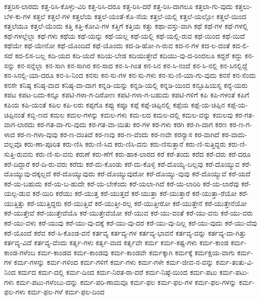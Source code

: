 {ಕತ್ತರಿಸ-ಲಾರದು
ಕತ್ತ-ರಿಸಿ-ಕೊಳ್ಳು-ವಿರಿ
ಕತ್ತ-ರಿಸಿ-ದರೂ
ಕತ್ತ-ರಿಸಿ-ದರೆ
ಕತ್ತ-ರಿಸಿ-ದಾಗಲೂ
ಕತ್ತಲಾ-ಗು-ವುದು
ಕತ್ತಲು-ಬೆಳ-ಕು-ಗಳ
ಕತ್ತಲೆ
ಕತ್ತಲೆ-ಗಳ
ಕತ್ತಲೆಯ
ಕತ್ತಲೆ-ಯಂತೆ-ಕೊ-ನೆಯ
ಕತ್ತಲೆ-ಯಲ್ಲಿ
ಕತ್ತಲೆ-ಯಲ್ಲೋ
ಕತ್ತಲೆ-ಯಿಂದ
ಕತ್ತಲೆಯೂ
ಕತ್ತಲೆ-ಯೆಂದು
ಕತ್ತಿ
ಕತ್ತಿ-ಕೋವಿ-ಗಳ
ಕತ್ತಿಗೆ
ಕತ್ತಿಯ
ಕತ್ತು
ಕಥಾ-ವಸ್ತು-ವಾಗಿ
ಕಥೆ
ಕಥೆ-ಗಳ
ಕಥೆ-ಗಳಲ್ಲಿ
ಕಥೆ-ಗಳಲ್ಲೆಲ್ಲಾ
ಕಥೆ-ಗಳು
ಕಥೆಯ
ಕಥೆ-ಯನ್ನು
ಕಥೆ-ಯಲ್ಲ
ಕಥೆ-ಯಲ್ಲಿ
ಕಥೆ-ಯಲ್ಲಿ-ರುವ
ಕಥೆ-ಯಿಂದ
ಕಥೆ-ಯಿದೆ
ಕಥೆಯೇ
ಕಥೆ-ಯೇನೋ
ಕಥೆ-ಯೊಂದಿದೆ
ಕಥೆ-ಯೊಂದು
ಕದ-ಡಿ-ಹೋ-ಗಿ-ರುವ
ಕದ-ನ-ಗಳ
ಕದ-ಲ-ದಂತೆ
ಕದ-ಲಿ-ಸದೆ
ಕದ-ಲಿಸ-ಬಲ್ಲ
ಕದಿ-ಯದ
ಕದಿ-ಯದೆ
ಕದಿಯ-ಬೇಡ
ಕದಿಯುತ್ತೇವೆ
ಕದಿಯು-ವು-ದ-ರಿಂದಲೂ
ಕದ್ದರೆ
ಕದ್ದು
ಕನ-ಸನ್ನು
ಕನ-ಸನ್ನೆಲ್ಲಾ
ಕನ-ಸಾಗಿ
ಕನ-ಸಾಗಿರ
ಕನ-ಸಾದ
ಕನ-ಸಿ-ಗಿಂತ
ಕನ-ಸಿನ
ಕನ-ಸಿ-ನಂದೆ
ಕನ-ಸಿ-ನಲ್ಲಿ
ಕನ-ಸಿನಲ್ಲಿದ್ದೆ
ಕನ-ಸಿನಲ್ಲಿ-ಯಾ-ದರೂ
ಕನ-ಸಿ-ನಿಂದ
ಕನಸು
ಕನ-ಸು-ಗಳ
ಕನ-ಸು-ಗಳು
ಕನ-ಸು-ಣಿ-ಯಾ-ಗು-ವುದು
ಕನಸೆ
ಕನ-ಸೆಂದು
ಕನಸೇ
ಕನಿಷ್ಠ
ಕನಿಷ್ಠ-ವಾದ
ಕನಿಷ್ಠ-ವಾ-ದಾಗ
ಕನ್ನಡಿ-ಯನ್ನು
ಕನ್ನಡಿ-ಯಲ್ಲಿ
ಕನ್ನಡಿ-ಯಿಂದ
ಕನ್ಫೂಷಿಯಸ್ನ
ಕನ್ಯೆ-ಯರು
ಕಪಟ
ಕಪಟ-ಬದು-ಕನ್ನೂ
ಕಪಟಿ-ಗಳಾ-ಗ-ದಿರೋಣ
ಕಪಟಿ-ಗಳಾ-ಗ-ಬಹುದು
ಕಪಟಿ-ಗಳಿಗೆ
ಕಪಿ
ಕಪಿ-ಗಳಂತೆ
ಕಪಿಗೆ
ಕಪಿಯ
ಕಪಿ-ಯಂತೆ
ಕಪಿಲ
ಕಪಿ-ಲರು
ಕಪ್ಪಗೊ
ಕಪ್ಪು
ಕಪ್ಪೂ
ಕಪ್ಪೆ
ಕಪ್ಪೆ-ಚಿಪ್ಪಿನಲ್ಲಿ
ಕಪ್ಪೆಯ
ಕಪ್ಪೆ-ಯ-ಚಿಪ್ಪಿನ
ಕಪ್ಪೆ-ಯ-ಚಿಪ್ಪಿನಂತೆ
ಕಬ್ಬಿ-ಣದ
ಕಮಲ
ಕಮಲ-ಗಳನ್ನು
ಕಮಲ-ಗಳು
ಕಮ-ಲದ
ಕಮಲ-ದಲ್ಲಿ
ಕಮಲ-ವನ್ನು
ಕಮಲವು
ಕರ-ಗತ-ವಾಗ-ಲಾರದು
ಕರ-ಗತ-ವಾ-ಗು-ವುದು
ಕರ-ಗತ-ವಾ-ಯಿತು
ಕರ-ಗಳ
ಕರ-ಗಳು
ಕರಗಿ
ಕರ-ಗಿ-ದಾಗ
ಕರಣ
ಕರ-ಣ-ಗ-ಳಾದ
ಕರ-ಣ-ಗಳಾ-ವುವು
ಕರ-ಣ-ದಂತಿದೆ
ಕರ-ಣವು
ಕರ-ಣ-ವೆಂದು
ಕರ-ಣವೇ
ಕರನ್ಯಾಸ
ಕರ-ವಾಗಿದೆ
ಕರ-ವಾದು-ವಲ್ಲವೊ
ಕರು-ಣಾ-ಪೂರಿತ
ಕರು-ಣಿಸಿ
ಕರು-ಣಿ-ಸಿದ
ಕರು-ಣಿಸಿ-ದನು
ಕರು-ಣಿಸುತ್ತಾನೆ
ಕರು-ಣಿ-ಸುತ್ತಿದ್ದರು
ಕರು-ಣಿ-ಸುತ್ತಿ-ರುವನು
ಕರು-ಣಿ-ಸು-ವನು
ಕರುಣೆ
ಕರು-ಣೆಗೆ
ಕರು-ಹಾಕ-ಲಾರದ
ಕರೆ
ಕರೆ-ತಂದು
ಕರೆದ
ಕರೆ-ದರು
ಕರೆ-ದರೂ
ಕರೆ-ದಿದ್ದಾರೆ
ಕರೆ-ದಿ-ರು-ವರು
ಕರೆದು
ಕರೆ-ದು-ಕೊಂಡು
ಕರೆ-ದು-ಕೊಳ್ಳಿ
ಕರೆ-ದೊಯ್ಯ-ಬಲ್ಲವು
ಕರೆ-ದೊಯ್ಯುವ
ಕರೆ-ದೊಯ್ಯುವು-ದಕ್ಕಲ್ಲದೆ
ಕರೆ-ದೊಯ್ಯುವುದು
ಕರೆ-ದೊಯ್ಯುವುದೋ
ಕರೆ-ದೊಯ್ಯು-ವುವು
ಕರೆ-ದೊಯ್ಯುವೆ
ಕರೆ-ಯದೆ
ಕರೆ-ಯ-ಬಹುದು
ಕರೆ-ಯ-ಬ-ಹುದೇ
ಕರೆ-ಯ-ಬೇಕೆಂದು
ಕರೆ-ಯಲಾ-ಗಿದೆ
ಕರೆ-ಯ-ಲಾರಿರಿ
ಕರೆ-ಯ-ಲಾರೆವು
ಕರೆ-ಯಲ್ಪ-ಡುವ
ಕರೆ-ಯಿರಿ
ಕರೆಯು
ಕರೆ-ಯುತ್ತ
ಕರೆ-ಯುತ್ತದೆ
ಕರೆ-ಯುತ್ತಾ
ಕರೆ-ಯುತ್ತಾರೆ
ಕರೆ-ಯುತ್ತಾ-ರೆಯೋ
ಕರೆ-ಯುತ್ತಿತ್ತು
ಕರೆ-ಯುತ್ತಿದ್ದರು
ಕರೆ-ಯುತ್ತಿವೆ
ಕರೆ-ಯುತ್ತೀ-ರಲ್ಲ
ಕರೆ-ಯುತ್ತೀರೋ
ಕರೆ-ಯುತ್ತೇನೆ
ಕರೆ-ಯುತ್ತೇನೆಯೋ
ಕರೆ-ಯುತ್ತೇವೆ
ಕರೆ-ಯುತ್ತೇವೆಯೊ
ಕರೆ-ಯುತ್ತೇವೆಯೋ
ಕರೆ-ಯುವ
ಕರೆ-ಯು-ವಂತೆ
ಕರೆ-ಯು-ವನು
ಕರೆ-ಯು-ವರು
ಕರೆ-ಯು-ವಳು
ಕರೆ-ಯುವು
ಕರೆ-ಯು-ವು-ದಕ್ಕೆ
ಕರೆ-ಯು-ವು-ದರ
ಕರೆ-ಯು-ವು-ದಿಲ್ಲ
ಕರೆ-ಯು-ವುದು
ಕರೆ-ಯು-ವೆವು
ಕರೆ-ಯೊಂದೆ
ಕರೆವ
ಕರೆ-ಸಿ-ಕೊಂಡ-ವನೆ
ಕರ್ತವ್ಯ
ಕರ್ತವ್ಯ-ಗಳ
ಕರ್ತವ್ಯ-ಭಾವನೆ
ಕರ್ತವ್ಯ-ವನ್ನು
ಕರ್ತವ್ಯ-ವಾ-ಗಿತ್ತು
ಕರ್ತವ್ಯ-ವಿದೆ
ಕರ್ತವ್ಯ-ವೆಂದು
ಕರ್ತೃ-ಗಳು
ಕರ್ತೃ-ವಾದ
ಕರ್ತೃವೇ
ಕರ್ಮ
ಕರ್ಮ-ಕಷ್ಟ-ಗಳು
ಕರ್ಮ-ಕಾಂಡ
ಕರ್ಮ-ಕಾಂಡ-ಗಳೆಂಬ
ಕರ್ಮ-ಕಾಂಡದ
ಕರ್ಮ-ಕಾಂಡವು
ಕರ್ಮ-ಕಾಂಡವೇ
ಕರ್ಮಕ್ಕಾಗಿ
ಕರ್ಮಕ್ಕೆ
ಕರ್ಮಕ್ಷಯ-ವಾಗು
ಕರ್ಮ-ಗಳ
ಕರ್ಮ-ಗಳನ್ನು
ಕರ್ಮ-ಗಳಿಂದ
ಕರ್ಮ-ಗಳಿಗೆ
ಕರ್ಮ-ಗಳು
ಕರ್ಮ-ಗಳೇ
ಕರ್ಮ-ಜೀವ-ನ-ವನ್ನು
ಕರ್ಮ-ತಂತು-ವಿ-ನಿಂದ
ಕರ್ಮದ
ಕರ್ಮ-ದಲ್ಲಿ
ಕರ್ಮ-ದಿಂದ
ಕರ್ಮ-ನಿರತ-ರಾ-ದರೆ
ಕರ್ಮ-ನಿಷ್ಠೆ-ಯಿಂದ
ಕರ್ಮ-ಪಟು
ಕರ್ಮ-ಪಟು-ಗಳು
ಕರ್ಮ-ಪಟು-ಗಳೆಂಬು-ದನ್ನು
ಕರ್ಮ-ಪರಿ-ಣಾಮವೂ
ಕರ್ಮ-ಫಲ
ಕರ್ಮ-ಫಲ-ಗಳ
ಕರ್ಮ-ಫಲ-ಗಳನ್ನು
ಕರ್ಮ-ಫಲ-ಗಳು
ಕರ್ಮ-ಫಲ-ಗಳೆ
ಕರ್ಮ-ಫಲ-ದಿಂದ
}
